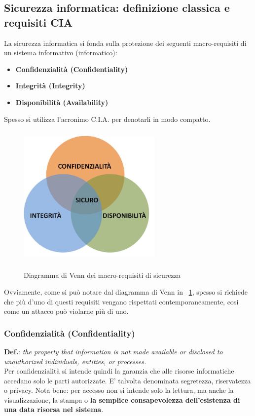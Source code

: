 \subsection{Sicurezza informatica: definizione classica e requisiti CIA}
La sicurezza informatica si fonda sulla protezione dei seguenti macro-requisiti di un sistema informativo (informatico):
\begin{itemize} 
  \item \textbf{Confidenzialità (Confidentiality)}
  \item \textbf{Integrità (Integrity)}
  \item \textbf{Disponibilità (Availability)}
\end{itemize}
Spesso si utilizza l'acronimo C.I.A. per denotarli in modo compatto.
\begin{figure}[htbp]
	\centering%
	\subfigure%
	{\includegraphics[height=7cm, width=7cm, keepaspectratio]{Immagini/introduzione/venn_security}}
	\caption{Diagramma di Venn dei macro-requisiti di sicurezza \label{fig:venn_security}} 	
\end{figure}
Ovviamente, come si può notare dal diagramma di Venn in \figurename~\ref{fig:venn_security}, spesso si richiede che più d'uno di questi requisiti vengano rispettati contemporaneamente, cosi come un attacco può violarne più di uno.

\subsubsection{Confidenzialità (Confidentiality)}
\textbf{Def.}: \textit{the property that information is not made available or disclosed to unauthorized individuals, entities, or processes.} \\

Per confidenzialità si intende quindi la garanzia che alle risorse informatiche accedano solo le parti autorizzate. E' talvolta denominata segretezza, riservatezza o privacy. Nota bene: per accesso non si intende solo la lettura, ma anche la visualizzazione, la stampa o \textbf{la semplice consapevolezza dell'esistenza di una data risorsa nel sistema}.

